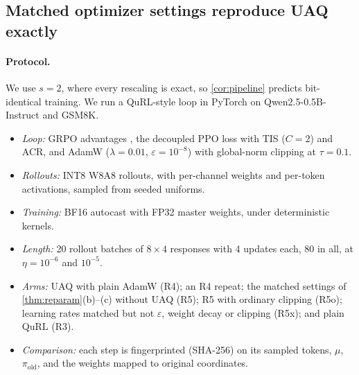 \subsection{Matched optimizer settings reproduce UAQ exactly}\label{sec:s2}

\paragraph{Protocol.} We use $s=2$, where every rescaling is exact, so \cref{cor:pipeline} predicts bit-identical training. We run a QuRL-style loop in PyTorch on Qwen2.5-0.5B-Instruct and GSM8K.
\begin{itemize}[leftmargin=*,itemsep=1pt]
\item \emph{Loop:} GRPO advantages \citep{shao2024deepseekmath}, the decoupled PPO loss with TIS ($C=2$) and ACR, and AdamW ($\lambda=0.01$, $\varepsilon=10^{-8}$) with global-norm clipping at $\tau=0.1$.
\item \emph{Rollouts:} INT8 W8A8 rollouts, with per-channel weights and per-token activations, sampled from seeded uniforms.
\item \emph{Training:} BF16 autocast with FP32 master weights, under deterministic kernels.
\item \emph{Length:} 20 rollout batches of $8\times4$ responses with 4 updates each, 80 in all, at $\eta=10^{-6}$ and $10^{-5}$.
\item \emph{Arms:} UAQ with plain AdamW (R4); an R4 repeat; the matched settings of \cref{thm:reparam}(b)--(c) without UAQ (R5); R5 with ordinary clipping (R5o); learning rates matched but not $\varepsilon$, weight decay or clipping (R5x); and plain QuRL (R3).
\item \emph{Comparison:} each step is fingerprinted (SHA-256) on its sampled tokens, $\mu$, $\pi_{\mathrm{old}}$, and the weights mapped to original coordinates.
\end{itemize}

